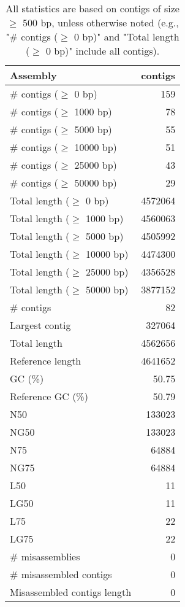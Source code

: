 \documentclass[12pt,a4paper]{article}
\begin{document}
\begin{table}[ht]
\begin{center}
\caption{All statistics are based on contigs of size $\geq$ 500 bp, unless otherwise noted (e.g., "\# contigs ($\geq$ 0 bp)" and "Total length ($\geq$ 0 bp)" include all contigs).}
\begin{tabular}{|l*{1}{|r}|}
\hline
Assembly & contigs \\ \hline
\# contigs ($\geq$ 0 bp) & 159 \\ \hline
\# contigs ($\geq$ 1000 bp) & 78 \\ \hline
\# contigs ($\geq$ 5000 bp) & 55 \\ \hline
\# contigs ($\geq$ 10000 bp) & 51 \\ \hline
\# contigs ($\geq$ 25000 bp) & 43 \\ \hline
\# contigs ($\geq$ 50000 bp) & 29 \\ \hline
Total length ($\geq$ 0 bp) & 4572064 \\ \hline
Total length ($\geq$ 1000 bp) & 4560063 \\ \hline
Total length ($\geq$ 5000 bp) & 4505992 \\ \hline
Total length ($\geq$ 10000 bp) & 4474300 \\ \hline
Total length ($\geq$ 25000 bp) & 4356528 \\ \hline
Total length ($\geq$ 50000 bp) & 3877152 \\ \hline
\# contigs & 82 \\ \hline
Largest contig & 327064 \\ \hline
Total length & 4562656 \\ \hline
Reference length & 4641652 \\ \hline
GC (\%) & 50.75 \\ \hline
Reference GC (\%) & 50.79 \\ \hline
N50 & 133023 \\ \hline
NG50 & 133023 \\ \hline
N75 & 64884 \\ \hline
NG75 & 64884 \\ \hline
L50 & 11 \\ \hline
LG50 & 11 \\ \hline
L75 & 22 \\ \hline
LG75 & 22 \\ \hline
\# misassemblies & 0 \\ \hline
\# misassembled contigs & 0 \\ \hline
Misassembled contigs length & 0 \\ \hline

\end{tabular}
\end{center}
\end{table}
\end{document}
